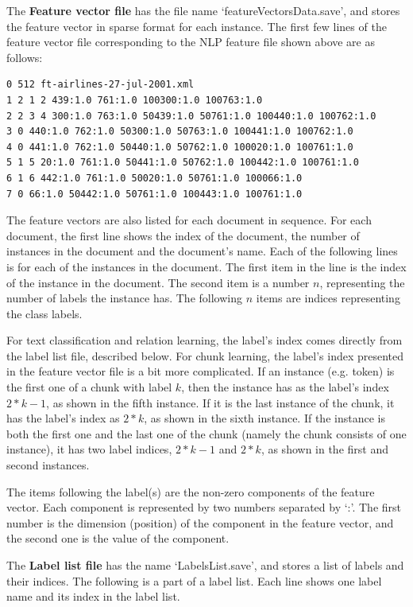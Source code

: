 The {\bf Feature vector file} has the file name `featureVectorsData.save',
and stores the feature vector in sparse format for each instance. The first few
lines of the feature vector file corresponding to the NLP feature file shown
above are as follows:

{\small
\begin{verbatim}
0 512 ft-airlines-27-jul-2001.xml
1 2 1 2 439:1.0 761:1.0 100300:1.0 100763:1.0
2 2 3 4 300:1.0 763:1.0 50439:1.0 50761:1.0 100440:1.0 100762:1.0
3 0 440:1.0 762:1.0 50300:1.0 50763:1.0 100441:1.0 100762:1.0
4 0 441:1.0 762:1.0 50440:1.0 50762:1.0 100020:1.0 100761:1.0
5 1 5 20:1.0 761:1.0 50441:1.0 50762:1.0 100442:1.0 100761:1.0
6 1 6 442:1.0 761:1.0 50020:1.0 50761:1.0 100066:1.0
7 0 66:1.0 50442:1.0 50761:1.0 100443:1.0 100761:1.0
\end{verbatim}
} 

The feature vectors are also listed for each document in sequence. For each
document, the first line shows the index of the document, the number of instances
in the document and the document's name. Each of the following lines is for each
of the instances in the document. The first item in the line is the index of the
instance in the document. The second item is a number $n$, representing the
number of labels the instance has.  The following $n$ items are indices
representing the class labels.

For text classification and relation learning, the label's index comes directly
from the label list file, described below. For chunk learning, the label's
index presented in the feature vector file is a bit more complicated. If an
instance (e.g. token) is the first one of a chunk with label $k$, then the
instance has as the label's index $2*k-1$, as shown in the fifth instance. If it
is the last instance of the chunk, it has the label's index as $2*k$, as shown in
the sixth instance. If the instance is both the first one and the last one of the
chunk (namely the chunk consists of one instance), it has two label indices,
$2*k-1$ and $2*k$, as shown in the first and second instances.

The items following the label(s) are the non-zero components of the feature
vector.  Each component is represented by two numbers separated by `:'. The
first number is the dimension (position) of the component in the feature vector,
and the second one is the value of the component.

The {\bf Label list file} has the name `LabelsList.save', and stores a list of
labels and their indices. The following is a part of a label list. Each line
shows one label name and its index in the label list.


